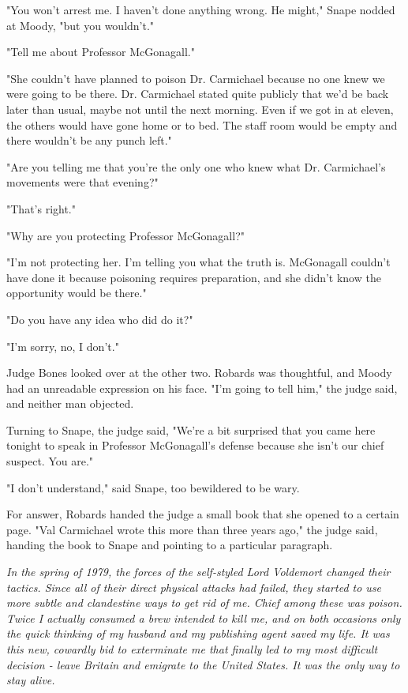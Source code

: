 "You won't arrest me. I haven't done anything wrong. He might," Snape nodded at Moody, "but you wouldn't."

"Tell me about Professor McGonagall."

"She couldn't have planned to poison Dr. Carmichael because no one knew we were going to be there. Dr. Carmichael stated quite publicly that we'd be back later than usual, maybe not until the next morning. Even if we got in at eleven, the others would have gone home or to bed. The staff room would be empty and there wouldn't be any punch left."

"Are you telling me that you're the only one who knew what Dr. Carmichael's movements were that evening?"

"That's right."

"Why are you protecting Professor McGonagall?"

"I'm not protecting her. I'm telling you what the truth is. McGonagall couldn't have done it because poisoning requires preparation, and she didn't know the opportunity would be there."

"Do you have any idea who did do it?"

"I'm sorry, no, I don't."

Judge Bones looked over at the other two. Robards was thoughtful, and Moody had an unreadable expression on his face. "I'm going to tell him," the judge said, and neither man objected.

Turning to Snape, the judge said, "We're a bit surprised that you came here tonight to speak in Professor McGonagall's defense because she isn't our chief suspect. You are."

"I don't understand," said Snape, too bewildered to be wary.

For answer, Robards handed the judge a small book that she opened to a certain page. "Val Carmichael wrote this more than three years ago," the judge said, handing the book to Snape and pointing to a particular paragraph.

\emph{In the spring of 1979, the forces of the self-styled Lord Voldemort changed their tactics. Since all of their direct physical attacks had failed, they started to use more subtle and clandestine ways to get rid of me. Chief among these was poison. Twice I actually consumed a brew intended to kill me, and on both occasions only the quick thinking of my husband and my publishing agent saved my life. It was this new, cowardly bid to exterminate me that finally led to my most difficult decision - leave Britain and emigrate to the United States. It was the only way to stay alive.}

